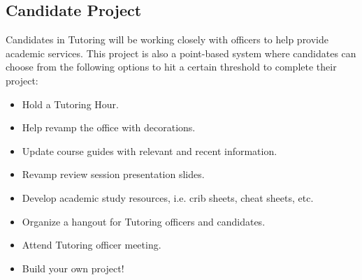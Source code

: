 \documentclass[11pt, article, oneside]{memoir}
\begin{document}
    \subsection{Candidate Project}
        Candidates in Tutoring will be working closely with officers to help provide academic services.
        This project is also a point-based system where candidates can choose from the following options to hit a certain threshold to complete their project:
        \begin{itemize}
            \item Hold a Tutoring Hour.
            \item Help revamp the office with decorations.
            \item Update course guides with relevant and recent information.
            \item Revamp review session presentation slides.
            \item Develop academic study resources, i.e. crib sheets, cheat sheets, etc.
            \item Organize a hangout for Tutoring officers and candidates.
            \item Attend Tutoring officer meeting.
            \item Build your own project! 
        \end{itemize}
    

    \newpage
\end{document}
